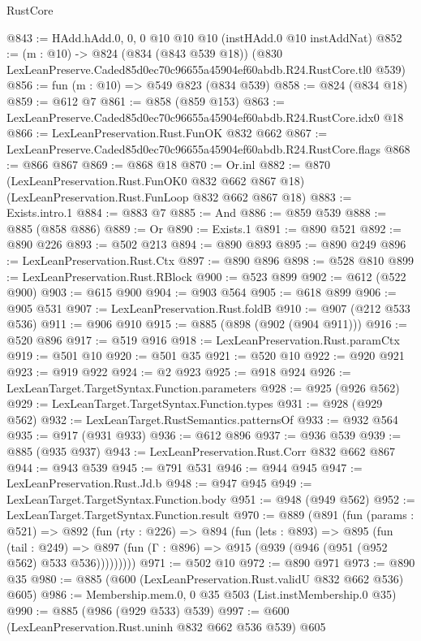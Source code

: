 \begin{lexlean}{RustCore}
\begin{coremodule}
@843 := HAdd.hAdd.{0, 0, 0} @10 @10 @10 (instHAdd.{0} @10 instAddNat)
@852 := (m : @10) ->
  @824
    (@834 (@843 @539 @18))
    (@830 LexLeanPreserve.Caded85d0ec70c96655a45904ef60abdb.R24.RustCore.tl0 @539)
@856 := fun (m : @10) => @549 @823 (@834 @539)
@858 := @824 (@834 @18)
@859 := @612 @7
@861 := @858 (@859 @153)
@863 := LexLeanPreserve.Caded85d0ec70c96655a45904ef60abdb.R24.RustCore.idx0 @18
@866 := LexLeanPreservation.Rust.FunOK @832 @662
@867 := LexLeanPreserve.Caded85d0ec70c96655a45904ef60abdb.R24.RustCore.flags
@868 := @866 @867
@869 := @868 @18
@870 := Or.inl
@882 := @870
    (LexLeanPreservation.Rust.FunOK0 @832 @662 @867 @18)
    (LexLeanPreservation.Rust.FunLoop @832 @662 @867 @18)
@883 := Exists.intro.{1}
@884 := @883 @7
@885 := And
@886 := @859 @539
@888 := @885 (@858 @886)
@889 := Or
@890 := Exists.{1}
@891 := @890 @521
@892 := @890 @226
@893 := @502 @213
@894 := @890 @893
@895 := @890 @249
@896 := LexLeanPreservation.Rust.Ctx
@897 := @890 @896
@898 := @528 @810
@899 := LexLeanPreservation.Rust.RBlock
@900 := @523 @899
@902 := @612 (@522 @900)
@903 := @615 @900
@904 := @903 @564
@905 := @618 @899
@906 := @905 @531
@907 := LexLeanPreservation.Rust.foldB
@910 := @907 (@212 @533 @536)
@911 := @906 @910
@915 := @885 (@898 (@902 (@904 @911)))
@916 := @520 @896
@917 := @519 @916
@918 := LexLeanPreservation.Rust.paramCtx
@919 := @501 @10
@920 := @501 @35
@921 := @520 @10
@922 := @920 @921
@923 := @919 @922
@924 := @2 @923
@925 := @918 @924
@926 := LexLeanTarget.TargetSyntax.Function.parameters
@928 := @925 (@926 @562)
@929 := LexLeanTarget.TargetSyntax.Function.types
@931 := @928 (@929 @562)
@932 := LexLeanTarget.RustSemantics.patternsOf
@933 := @932 @564
@935 := @917 (@931 @933)
@936 := @612 @896
@937 := @936 @539
@939 := @885 (@935 @937)
@943 := LexLeanPreservation.Rust.Corr @832 @662 @867
@944 := @943 @539
@945 := @791 @531
@946 := @944 @945
@947 := LexLeanPreservation.Rust.Jd.b
@948 := @947 @945
@949 := LexLeanTarget.TargetSyntax.Function.body
@951 := @948 (@949 @562)
@952 := LexLeanTarget.TargetSyntax.Function.result
@970 := @889
    (@891
      (fun (params : @521) =>
      @892
        (fun (rty : @226) =>
        @894
          (fun (lets : @893) =>
          @895
            (fun (tail : @249) =>
            @897 (fun (Γ : @896) => @915 (@939 (@946 (@951 (@952 @562) @533 @536)))))))))
@971 := @502 @10
@972 := @890 @971
@973 := @890 @35
@980 := @885 (@600 (LexLeanPreservation.Rust.validU @832 @662 @536) @605)
@986 := Membership.mem.{0, 0} @35 @503 (List.instMembership.{0} @35)
@990 := @885 (@986 (@929 @533) @539)
@997 := @600 (LexLeanPreservation.Rust.uninh @832 @662 @536 @539) @605

\end{coremodule}
\end{lexlean}
